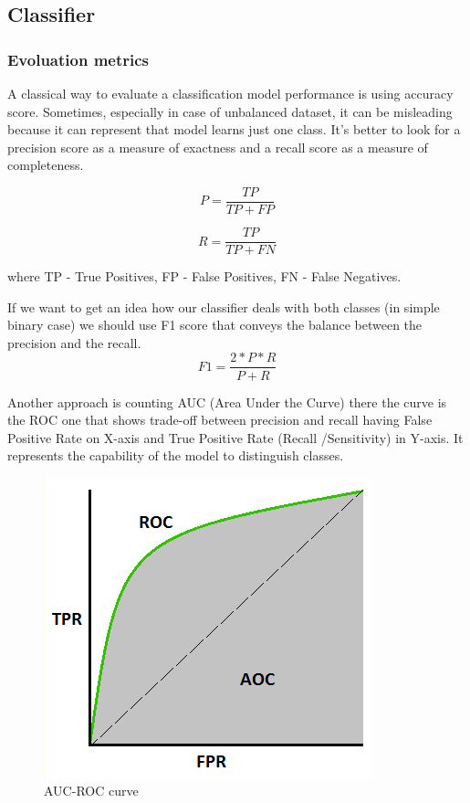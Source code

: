 \documentclass[11pt]{article}
\begin{document}
\subsection{Classifier}

\subsubsection{Evoluation metrics}

A classical way to evaluate a classification model performance is using accuracy score. Sometimes, especially in case of unbalanced dataset, it can be misleading because it can represent that model learns just one class. It’s better to look for a precision score as a measure of exactness and a recall score as a measure of completeness.

\begin{equation}
P = \frac{TP}{TP+FP} 
\end{equation}

\begin{equation}
R = \frac{TP}{TP+FN}
\end{equation}

where TP - True Positives, FP - False Positives, FN - False Negatives.

If we want to get an idea how our classifier deals with both classes (in simple binary case) we should use F1 score that conveys the balance between the precision and the recall.
\begin{equation}
F1 = \frac{2*P*R}{P+R}
\end{equation}

Another approach is counting AUC (Area Under the Curve) there the curve is the ROC one that shows trade-off between precision and recall having False Positive Rate on X-axis and True Positive Rate (Recall /Sensitivity) in Y-axis. It represents the capability of the model to distinguish classes.

\begin{figure}[h]
	\centering
	\includegraphics[scale=0.7]{roc_auc.png}
	\caption{AUC-ROC curve}
\label{lda_gm_cm}
\end{figure}
\FloatBarrier
\end{document}
